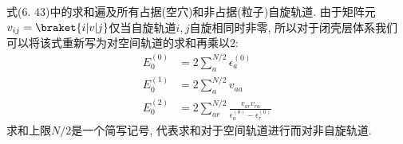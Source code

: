 式(6.
43)中的求和遍及所有占据(空穴)和非占据(粒子)自旋轨道. 
由于矩阵元$v_{ij} = \braket{i|v|j}$仅当自旋轨道$i,j$自旋相同时非零, 
所以对于闭壳层体系我们可以将该式重新写为对空间轨道的求和再乘以$2$:
\begin{subequations}
	\begin{align}
	E_0^{(0)} & = 2\sum_a^{N/2}\epsilon_a^{(0)}\\
	E_0^{(1)} & = 2\sum_a^{N/2}v_{aa} \\
	E_0^{(2)} & = 2\sum_{ar}^{N/2}\frac{v_{ar}v_{ra}}{\epsilon_a^{(0)} - \epsilon_r^{(0)}}
	\end{align}
\end{subequations}
求和上限$N/2$是一个简写记号, 
代表求和对于空间轨道进行而对非自旋轨道.

